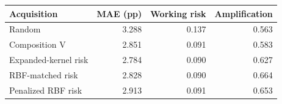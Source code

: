 \begin{tabular}{lrrr}\toprule
Acquisition & MAE (pp) & Working risk & Amplification \\ \midrule
Random & 3.288 & 0.137 & 0.563 \\
Composition V & 2.851 & 0.091 & 0.583 \\
Expanded-kernel risk & 2.784 & 0.090 & 0.627 \\
RBF-matched risk & 2.828 & 0.090 & 0.664 \\
Penalized RBF risk & 2.913 & 0.091 & 0.653 \\
\bottomrule\end{tabular}
